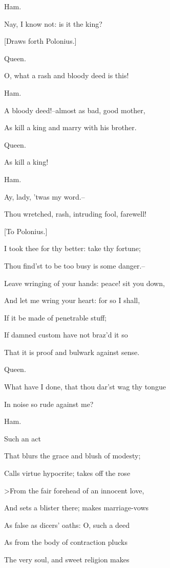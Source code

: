 \documentclass[12pt]{book}
\begin{document}
Ham.

Nay, I know not: is it the king?



[Draws forth Polonius.]



Queen.

O, what a rash and bloody deed is this!



Ham.

A bloody deed!--almost as bad, good mother,

As kill a king and marry with his brother.



Queen.

As kill a king!



Ham.

Ay, lady, 'twas my word.--

Thou wretched, rash, intruding fool, farewell!

[To Polonius.]

I took thee for thy better: take thy fortune;

Thou find'st to be too busy is some danger.--

Leave wringing of your hands: peace! sit you down,

And let me wring your heart: for so I shall,

If it be made of penetrable stuff;

If damned custom have not braz'd it so

That it is proof and bulwark against sense.



Queen.

What have I done, that thou dar'st wag thy tongue

In noise so rude against me?



Ham.

Such an act

That blurs the grace and blush of modesty;

Calls virtue hypocrite; takes off the rose

>From the fair forehead of an innocent love,

And sets a blister there; makes marriage-vows

As false as dicers' oaths: O, such a deed

As from the body of contraction plucks

The very soul, and sweet religion makes
\end{document}
